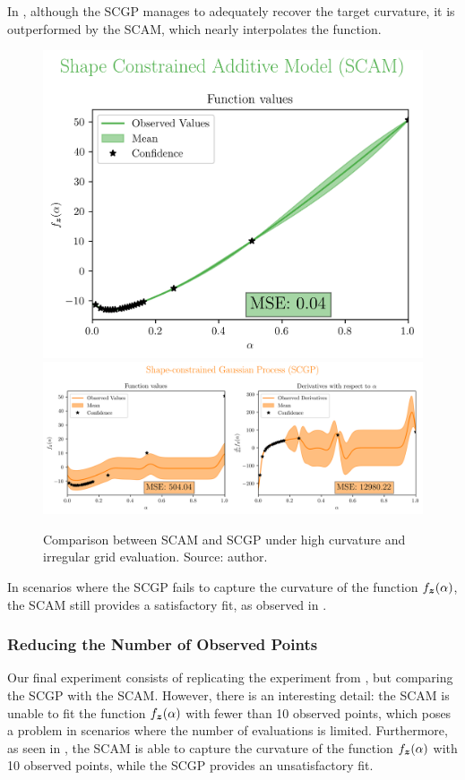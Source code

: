 In , although the SCGP manages to adequately recover the target curvature, it is outperformed by the SCAM, which nearly interpolates the function.

\begin{figure}[H]
    \centering
    \includegraphics[width=.33\textwidth]{../experiments/adaptive_new_HC/SCAM_20_nobs.png}
    \includegraphics[width=.66\textwidth]{../experiments/adaptive_new_HC/SCGP_20_nobs.png}
    \caption{ {\small Comparison between SCAM and SCGP under high curvature and irregular grid evaluation. Source: author.}}
    \label{fig:SCAMadaptiveHC}
\end{figure}

In scenarios where the SCGP fails to capture the curvature of the function \( f_{\boldsymbol{z}}(\alpha) \), the SCAM still provides a satisfactory fit, as observed in .

\subsubsection{Reducing the Number of Observed Points}

Our final experiment consists of replicating the experiment from , but comparing the SCGP with the SCAM. However, there is an interesting detail: the SCAM is unable to fit the function \( f_{\boldsymbol{z}}(\alpha) \) with fewer than 10 observed points, which poses a problem in scenarios where the number of evaluations is limited. Furthermore, as seen in , the SCAM is able to capture the curvature of the function \( f_{\boldsymbol{z}}(\alpha) \) with 10 observed points, while the SCGP provides an unsatisfactory fit.

